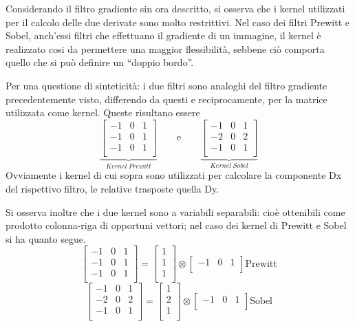 \documentclass{subfiles}
\begin{document}
Considerando il filtro gradiente sin ora descritto, si osserva che i kernel utilizzati per il calcolo delle due derivate sono molto restrittivi.
Nel caso dei filtri Prewitt e Sobel, anch'essi filtri che effettuano il gradiente di un immagine, il kernel è realizzato cosi da permettere una maggior flessibilità,
sebbene ciò comporta quello che si può definire un ``doppio bordo''.

Per una questione di sinteticità: i due filtri sono analoghi del filtro gradiente precedentemente visto, differendo da questi e reciprocamente,
per la matrice utilizzata come kernel. Queste risultano essere
\[\underbrace{\begin{bmatrix}
            -1 & 0 & 1 \\
            -1 & 0 & 1 \\
            -1 & 0 & 1 \\
        \end{bmatrix}}_{Kernel \ Prewitt} \qquad \text{e} \qquad \underbrace{\begin{bmatrix}
            -1 & 0 & 1 \\
            -2 & 0 & 2 \\
            -1 & 0 & 1 \\
        \end{bmatrix}}_{Kernel \ Sobel}\]
Ovviamente i kernel di cui sopra sono utilizzati per calcolare la componente Dx del rispettivo filtro, le relative trasposte quella Dy.

Si osserva inoltre che i due kernel sono a variabili separabili: cioè ottenibili come prodotto colonna-riga di opportuni vettori;
nel caso dei kernel di Prewitt e Sobel si ha quanto segue.
\[\begin{bmatrix}
        -1 & 0 & 1 \\
        -1 & 0 & 1 \\
        -1 & 0 & 1 \\
    \end{bmatrix} = \begin{bmatrix}
        1 \\
        1 \\
        1 \\
    \end{bmatrix} \otimes \begin{bmatrix}
        -1 & 0 & 1 \\
    \end{bmatrix} \text{Prewitt}\]
\[\begin{bmatrix}
        -1 & 0 & 1 \\
        -2 & 0 & 2 \\
        -1 & 0 & 1 \\
    \end{bmatrix} = \begin{bmatrix}
        1 \\
        2 \\
        1 \\
    \end{bmatrix} \otimes \begin{bmatrix}
        -1 & 0 & 1 \\
    \end{bmatrix} \text{Sobel}\]
\end{document}
